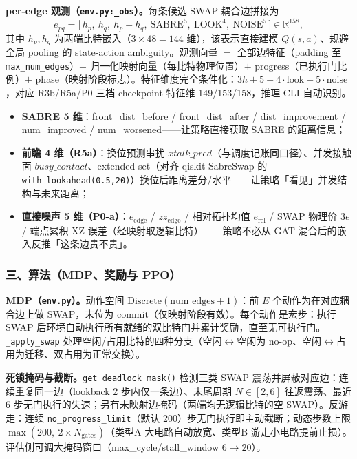 \textbf{per-edge 观测（\texttt{env.py:\_obs}）。}每条候选 SWAP 耦合边拼接为
\[
e_{pq}=\big[\,h_p,\ h_q,\ h_p-h_q,\ \mathrm{SABRE}^{5},\ \mathrm{LOOK}^{4},\ \mathrm{NOISE}^{5}\,\big]\in\mathbb{R}^{158},
\]
其中 $h_p,h_q$ 为两端比特嵌入（$3\times48=144$ 维），该表示直接建模 $Q(s,a)$、规避全局 pooling 的 state-action ambiguity。观测向量 $=$ 全部边特征（padding 至 \texttt{max\_num\_edges}）$+$ 归一化映射向量（每比特物理位置）$+$ progress（已执行门比例）$+$ phase（映射阶段标志）。特征维度完全条件化：$3h{+}5{+}4\cdot\mathrm{look}{+}5\cdot\mathrm{noise}$，对应 R3b/R5a/P0 三档 checkpoint 特征维 149/153/158，推理 CLI 自动识别。
\begin{itemize}
    \item \textbf{SABRE 5 维}：front\_dist\_before / front\_dist\_after / dist\_improvement / num\_improved / num\_worsened——让策略直接获取 SABRE 的距离信息；
    \item \textbf{前瞻 4 维（R5a）}：换位预测串扰 $xtalk\_pred$（与调度记账同口径）、并发接触面 $busy\_contact$、extended set（对齐 qiskit SabreSwap 的 \texttt{with\_lookahead(0.5,20)}）换位后距离差分/水平——让策略「看见」并发结构与未来距离；
    \item \textbf{直接噪声 5 维（P0-a）}：$e_{\mathrm{edge}}$ / $zz_{\mathrm{edge}}$ / 相对拓扑均值 $e_{\mathrm{rel}}$ / SWAP 物理价 $3e$ / 端点累积 XZ 误差（经映射取逻辑比特）——策略不必从 GAT 混合后的嵌入反推「这条边贵不贵」。
\end{itemize}


\subsubsection{三、算法（MDP、奖励与 PPO）}

\textbf{MDP（\texttt{env.py}）。}动作空间 $\mathrm{Discrete}(\mathrm{num\_edges}+1)$：前 $E$ 个动作为在对应耦合边上做 SWAP，末位为 commit（仅映射阶段有效）。每个动作是宏步：执行 SWAP 后环境自动执行所有就绪的双比特门并累计奖励，直至无可执行门。\texttt{\_apply\_swap} 处理空闲/占用比特的四种分支（空闲$\leftrightarrow$空闲为 no-op、空闲$\leftrightarrow$占用为迁移、双占用为正常交换）。

\textbf{死锁掩码与截断。}\texttt{get\_deadlock\_mask()} 检测三类 SWAP 震荡并屏蔽对应边：连续重复同一边（lookback 2 步内仅一条边）、末尾周期 $N\in[2,6]$ 往返震荡、最近 6 步无门执行的失速；另有未映射边掩码（两端均无逻辑比特的空 SWAP）。反游走：连续 \texttt{no\_progress\_limit}（默认 200）步无门执行即主动截断；动态步数上限 $\max(200,\ 2\times N_{\mathrm{gates}})$（类型A 大电路自动放宽、类型B 游走小电路提前止损）。评估侧可调大掩码窗口（max\_cycle/stall\_window $6\to20$）。

